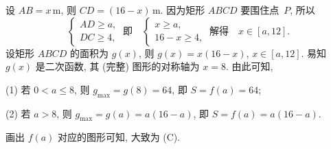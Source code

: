 \begin{solution}
    设 $AB=x$\,m, 则 $CD=(16-x)$\,m. 因为矩形 $ABCD$ 要围住点~$P$, 所以
    \[\left\{\!\!\begin{array}{l}
        AD\geqslant a,\\
        DC\geqslant 4,
      \end{array}\right.\ \text{即}\quad
      \left\{\!\!\begin{array}{l}
        x\geqslant a,\\
        16-x\geqslant 4, 
      \end{array}\right.\ \text{解得}\quad
      x\in[a,12].\]
    设矩形 $ABCD$ 的面积为 $g(x)$, 则 $g(x)=x(16-x)$, $ x\in[a,12]$. 易知 $g(x)$ 是二次函数, 其 (完整) 图形的对称轴为 $x=8$. 由此可知,
    
    (1) 若 $0<a\leqslant 8$, 则 $g_{\max}= g(8)= 64$, 即 $S=f(a)=64$;
    
    (2) 若 $a>8$, 则 $g_{\max}= g(a)= a(16-a)$, 即 $S=f(a)=a(16-a)$.
    
    画出 $f(a)$ 对应的图形可知, 大致为 (C).
\end{solution}

